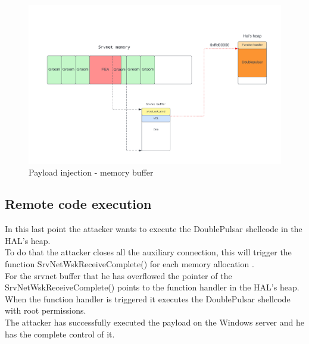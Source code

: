 \begin{figure}[ht!]
    \centering
      \includegraphics[scale=0.5]{images/exploit_6_buff.png}
      \caption{Payload injection - memory buffer}
\end{figure}

\clearpage
\subsection{Remote code execution}
In this last point the attacker wants to execute the DoublePulsar shellcode in the HAL's heap.\\
To do that the attacker closes all the auxiliary connection, this will trigger the function SrvNetWskReceiveComplete() for each memory allocation\cite{eternalblue-checkpoint} .\\
For the srvnet buffer that he has overflowed the pointer of the SrvNetWskReceiveComplete() points to the function handler in the HAL's heap. 
When the function handler is triggered it executes the DoublePulsar shellcode with root permissions.\\
The attacker has successfully executed the payload on the Windows server and he has the complete control of it.


